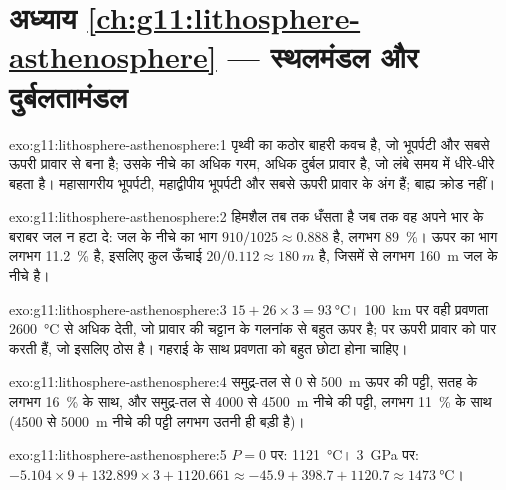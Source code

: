 \section*{अध्याय \ref{ch:g11:lithosphere-asthenosphere} --- स्थलमंडल और दुर्बलतामंडल}

\begin{solution}{exo:g11:lithosphere-asthenosphere:1}
 पृथ्वी का कठोर बाहरी कवच है, जो भूपर्पटी और
सबसे ऊपरी प्रावार से बना है;  उसके नीचे का अधिक गरम, अधिक दुर्बल प्रावार है,
जो लंबे समय में धीरे-धीरे बहता है। महासागरीय भूपर्पटी, महाद्वीपीय
भूपर्पटी और सबसे ऊपरी प्रावार  के अंग हैं; बाह्य क्रोड
नहीं।
\end{solution}

\begin{solution}{exo:g11:lithosphere-asthenosphere:2}
हिमशैल तब तक धँसता है जब तक वह अपने भार के बराबर जल न हटा दे:
जल के नीचे का भाग $910/1025 \approx 0.888$ है, लगभग \qty{89}{\percent}।
ऊपर का भाग लगभग \qty{11.2}{\percent} है, इसलिए कुल ऊँचाई
$20/0.112 \approx \qty{180}{m}$ है, जिसमें से लगभग \qty{160}{m} जल के
नीचे है।
\end{solution}

\begin{solution}{exo:g11:lithosphere-asthenosphere:3}
$15 + 26 \times 3 = \qty{93}{\celsius}$। \qty{100}{km} पर वही प्रवणता
\qty{2600}{\celsius} से अधिक देती, जो प्रावार की चट्टान के गलनांक से बहुत
ऊपर है; पर  ऊपरी प्रावार को पार करती हैं, जो इसलिए ठोस है।
गहराई के साथ प्रवणता को बहुत छोटा होना चाहिए।
\end{solution}

\begin{solution}{exo:g11:lithosphere-asthenosphere:4}
समुद्र-तल से 0 से \qty{500}{m} ऊपर की पट्टी, सतह के लगभग
\qty{16}{\percent} के साथ, और समुद्र-तल से 4000 से \qty{4500}{m}
नीचे की पट्टी, लगभग \qty{11}{\percent} के साथ (4500 से
\qty{5000}{m} नीचे की पट्टी लगभग उतनी ही बड़ी है)।
\end{solution}

\begin{solution}{exo:g11:lithosphere-asthenosphere:5}
$P = 0$ पर: \qty{1121}{\celsius}। \qty{3}{GPa} पर: $-5.104 \times 9 +
132.899 \times 3 + 1120.661 \approx -45.9 + 398.7 + 1120.7 \approx
\qty{1473}{\celsius}$।
\end{solution}

